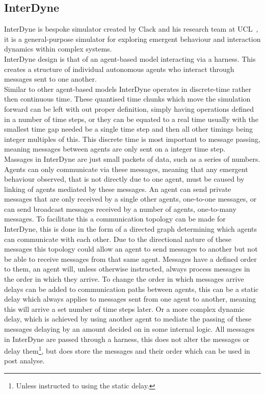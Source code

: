 \documentclass{article}
\begin{document}
\subsection{InterDyne} \label{InterDyne_section}
InterDyne is bespoke simulator created by Clack and his research team at UCL~\cite{Chris_webPage}, it is a general-purpose simulator for exploring emergent behaviour and interaction dynamics within complex systems.\\
InterDyne design is that of an agent-based model interacting via a harness. This creates a structure of individual autonomous agents who interact through messages sent to one another.\\ 
Similar to other agent-based models InterDyne operates in discrete-time rather then continuous time. These quantised time chunks which move the simulation forward can be left with out proper definition, simply having operations defined in a number of time steps, or they can be equated to a real time usually with the smallest time gap needed be a single time step and then all other timings being integer multiples of this. This discrete time is most important to message passing, meaning messages between agents are only sent on a integer time step.\\ 
Massages in InterDyne are just small packets of data, such as a series of numbers.  Agents can only communicate via these messages, meaning that any emergent behaviour observed, that is not directly due to one agent, must be caused by linking of agents mediated by these messages. An agent can send private messages that are only received by a single other agents, one-to-one messages, or can send broadcast messages received by a number of agents, one-to-many messages. To facilitate this a communication topology can be made for InterDyne, this is done in the form of a directed graph determining which agents can communicate with each other. Due to the directional nature of these messages this topology could allow an agent to send messages to another but not be able to receive messages from that same agent. Messages have a defined order to them, an agent will, unless otherwise instructed, always process messages in the order in which they arrive. To change the order in which messages arrive delays can be added to communication paths between agents, this can be a static delay which always applies to messages sent from one agent to another, meaning this will arrive a set number of time steps later. Or a more complex dynamic delay, which is achieved by using another agent to mediate the passing of these messages delaying by an amount decided on in some internal logic. All messages in InterDyne are passed through a harness, this does not alter the messages or delay them\footnote{Unless instructed to using the static delay.}, but does store the messages and their order which can be used in post analyse.\\         
\end{document}
